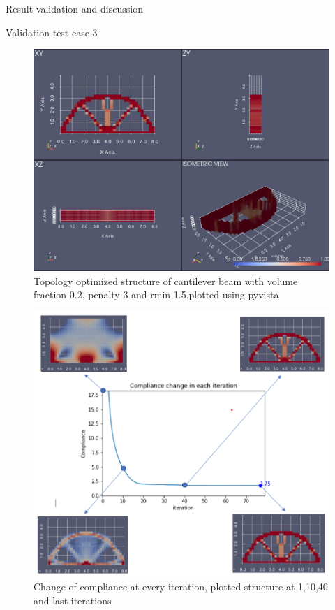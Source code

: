 \documentclass[a4paper,12pt,times]{article}
\begin{document}
\begin{section}{Result validation and discussion}
\begin{subsection}{Validation test case-3}
\begin{figure}[H]
\centering
\includegraphics[width=1\linewidth]{Numerical_result_full_MMA_03.jpg}
\centering
\caption{Topology optimized structure of cantilever beam with volume fraction 0.2, penalty 3 and rmin 1.5,plotted using pyvista}
\label{VC-05.3}
\end{figure}
\begin{figure}[H]
\centering
\includegraphics[width=1\linewidth]{Compliance_chg_MMA_03.png}
\centering
\caption{Change of compliance at every iteration, plotted structure at 1,10,40 and last iterations}


\end{figure}
\end{subsection}
\end{section}
\end{document}
